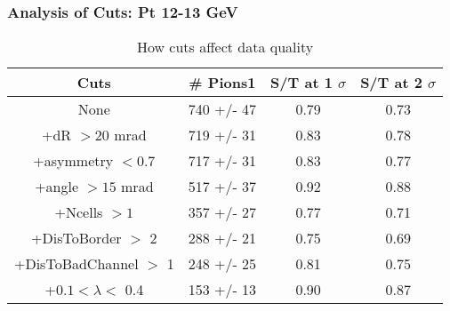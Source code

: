 \frame
{
\frametitle{Analysis of Cuts: Pt 12-13 GeV}
\begin{table}
\caption{How cuts affect data quality}
\centering
\begin{tabular}{c c c c}
\hline\hline
Cuts & \# Pions1 & S/T at 1 $\sigma$ & S/T at 2 $\sigma$ \\ [0.5ex]
\hline
None &  740 +/-   47 & 0.79 & 0.73 \\ %
+dR $> 20$ mrad &  719 +/-   31 & 0.83 & 0.78 \\ %
+asymmetry $< 0.7$ &  717 +/-   31 & 0.83 & 0.77 \\ %
+angle $> 15$ mrad &  517 +/-   37 & 0.92 & 0.88 \\ %
+Ncells $> 1$&  357 +/-   27 & 0.77 & 0.71 \\ %
+DisToBorder $>$ 2 &  288 +/-   21 & 0.75 & 0.69 \\ %
+DisToBadChannel $>$ 1&  248 +/-   25 & 0.81 & 0.75 \\ %
+$0.1 < \lambda <$ 0.4 &  153 +/-   13 & 0.90 & 0.87 \\ %
[1ex]
\hline
\end{tabular}
\label{table:nonlin}
\end{table}
}
